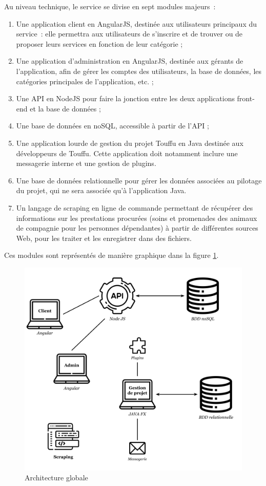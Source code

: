 \documentclass[conference]{IEEEtran}
\begin{document}
Au niveau technique, le service se divise en sept modules majeurs :
\begin{enumerate}
	\item Une application client en AngularJS, destinée aux utilisateurs principaux du service : elle permettra aux utilisateurs de s'inscrire et de trouver ou de proposer leurs services en fonction de leur catégorie ;
	\item Une application d'administration en AngularJS, destinée aux gérants de l'application, afin de gérer les comptes des utilisateurs, la base de données, les catégories principales de l'application, etc. ;
	\item Une API en NodeJS pour faire la jonction entre les deux applications front-end et la base de données ;
	\item Une base de données en noSQL, accessible à partir de l'API ;
	\item Une application lourde de gestion du projet Touffu en Java destinée aux développeurs de Touffu. Cette application doit notamment inclure une messagerie interne et une gestion de plugins.
	\item Une base de données relationnelle pour gérer les données associées au pilotage du projet, qui ne sera associée qu'à l'application Java.
	\item Un langage de scraping en ligne de commande permettant de récupérer des informations sur les prestations procurées (soins et promenades des animaux de compagnie pour les personnes dépendantes) à partir de différentes sources Web, pour les traiter et les enregistrer dans des fichiers.
\end{enumerate}
Ces modules sont représentés de manière graphique dans la figure \ref{fig:architecture}.

\begin{figure}[h]
    \centering
    \includegraphics[width=\columnwidth]{Ressources/Architecture.png}
    \caption{Architecture globale}
    \label{fig:architecture}
\end{figure}
\end{document}
